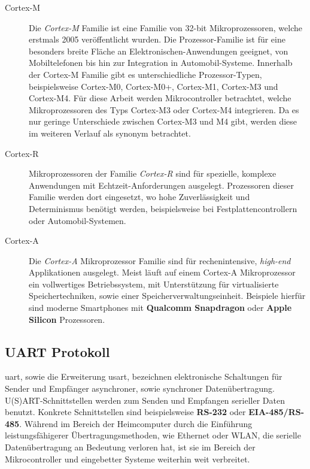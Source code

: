 \begin{description}
    \item[Cortex-M]
    Die \textit{Cortex-M} Familie ist eine Familie von 32-bit Mikroprozessoren,
    welche erstmals 2005 veröffentlicht wurden\cite{DefGuideCM34_JYiu}.
    Die Prozessor-Familie ist für eine besonders breite Fläche an
    Elektronischen-Anwendungen geeignet, von Mobiltelefonen bis hin zur
    Integration in Automobil-Systeme.
    Innerhalb der Cortex-M Familie gibt es unterschiedliche Prozessor-Typen,
    beispielsweise Cortex-M0, Cortex-M0+, Cortex-M1, Cortex-M3 und
    Cortex-M4\cite{DefGuideCM34_JYiu}.
    Für diese Arbeit werden Mikrocontroller betrachtet, welche Mikroprozessoren
    des Typs Cortex-M3 oder Cortex-M4 integrieren.
    Da es nur geringe Unterschiede zwischen Cortex-M3 und M4 gibt, werden diese
    im weiteren Verlauf als synonym betrachtet.
    \item[Cortex-R] 
    Mikroprozessoren der Familie \textit{Cortex-R} sind für spezielle, komplexe
    Anwendungen mit Echtzeit-Anforderungen ausgelegt.
    Prozessoren dieser Familie werden dort eingesetzt, wo hohe Zuverlässigkeit
    und Determinismus benötigt werden, beispielsweise bei
    Festplattencontrollern oder Automobil-Systemen\cite{DefGuideCM34_JYiu}.
    \item[Cortex-A] 
    Die \textit{Cortex-A} Mikroprozessor Familie sind für rechenintensive,
    \textit{high-end} Applikationen ausgelegt.
    Meist läuft auf einem Cortex-A Mikroprozessor ein vollwertiges
    Betriebssystem, mit Unterstützung für virtualisierte Speichertechniken,
    sowie einer Speicherverwaltungseinheit\cite{DefGuideCM34_JYiu}.
    Beispiele hierfür sind moderne Smartphones mit \textbf{Qualcomm Snapdragon}
    oder \textbf{Apple Silicon} Prozessoren.
\end{description}

\subsection{UART Protokoll}

\ac{uart}, sowie die Erweiterung \ac{usart}, bezeichnen elektronische
Schaltungen für Sender und Empfänger asynchroner, sowie synchroner
Datenübertragung\cite{Digitec_WGehrke_MWinzker}.
U(S)ART-Schnittstellen werden zum Senden und Empfangen serieller Daten benutzt.
Konkrete Schnittstellen sind beispielsweise \textbf{RS-232} oder
\textbf{EIA-485/RS-485}.
Während im Bereich der Heimcomputer durch die Einführung leistungsfähigerer
Übertragungsmethoden, wie Ethernet oder WLAN, die serielle Datenübertragung an
Bedeutung verloren hat, ist sie im Bereich der Mikrocontroller und eingebetter
Systeme weiterhin weit verbreitet\cite{Digitec_WGehrke_MWinzker}.

